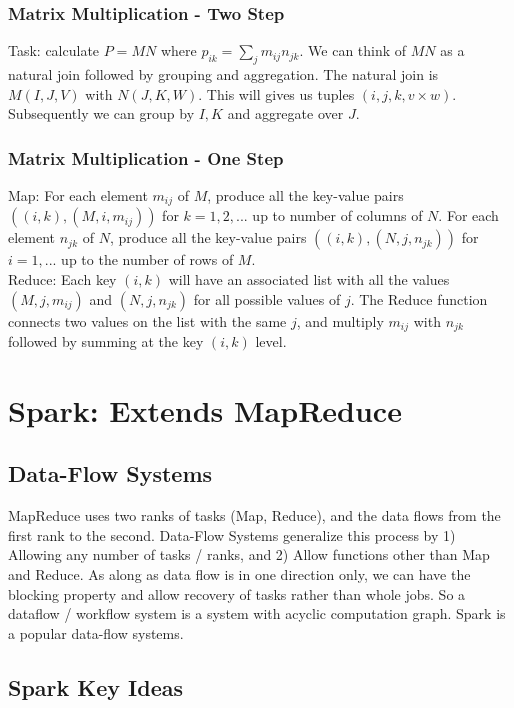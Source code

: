 \subsubsection{Matrix Multiplication - Two Step} 
Task: calculate $P = MN$ where $p_{ik}=\sum_j m_{ij}n_{jk}$. We can think of $MN$ as a natural join followed by grouping and aggregation. The natural join is $M(I, J, V)$ with $N(J,K,W)$. This will gives us tuples $(i, j, k, v \times w)$. Subsequently we can group by $I, K$ and aggregate over $J$. 

\subsubsection{Matrix Multiplication - One Step} 

Map: For each element $m_{ij}$ of $M$, produce all the key-value pairs $((i,k), (M,i,m_{ij}))$ for $k=1,2,...$ up to number of columns of $N$. For each element $n_{jk}$ of $N$, produce all the key-value pairs $((i,k),(N,j,n_{jk}))$ for $i=1,...$ up to the number of rows of $M$. \\

Reduce: Each key $(i,k)$ will have an associated list with all the values $(M,j,m_{ij})$ and $(N,j, n_{jk})$ for all possible values of $j$. The Reduce function connects two values on the list with the same $j$, and multiply $m_{ij}$ with $n_{jk}$ followed by summing at the key $(i,k)$ level. 
 
 
\section{Spark: Extends MapReduce} 

\subsection{Data-Flow Systems} 
MapReduce uses two ranks of tasks (Map, Reduce), and the data flows from the first rank to the second. Data-Flow Systems generalize this process by 1) Allowing any number of tasks / ranks, and 2) Allow functions other than Map and Reduce. As along as data flow is in one direction only, we can have the blocking property and allow recovery of tasks rather than whole jobs.  So a dataflow / workflow system is a system with acyclic computation graph. Spark is a popular data-flow systems. 

\subsection{Spark Key Ideas}
